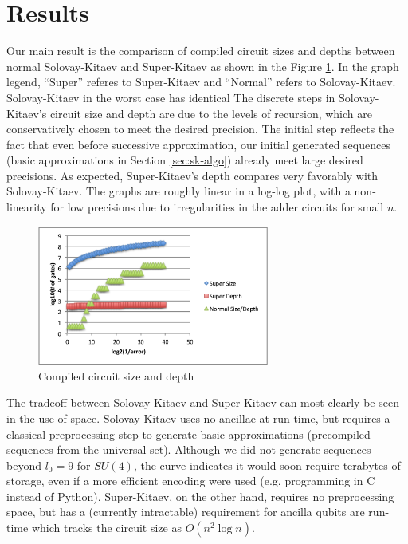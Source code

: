 \section{Results}
\label{sec:results}

Our main result is the comparison of compiled circuit sizes and depths between 
normal Solovay-Kitaev and Super-Kitaev as shown in the Figure
\ref{fig:size-depth}. In the graph legend, ``Super'' referes to Super-Kitaev
and ``Normal'' refers to Solovay-Kitaev.
Solovay-Kitaev in the worst case has identical
The discrete steps in Solovay-Kitaev's circuit size and depth are due
to the levels of recursion, which are conservatively chosen to meet
the desired precision. The initial step reflects the fact that even
before successive approximation, our initial generated sequences
(basic approximations in Section \ref{sec:sk-algo}) already meet large
desired precisions. As expected, Super-Kitaev's depth compares very
favorably with Solovay-Kitaev.
The graphs are roughly linear in a log-log plot, with a non-linearity
for low precisions due to irregularities in the adder circuits for small
$n$.

\begin{center}
\begin{figure}[h!]
\label{fig:size-depth}
\includegraphics[width=3in]{circuit-size-depth.eps}
\caption{Compiled circuit size and depth}
\end{figure}
\end{center}

The tradeoff between Solovay-Kitaev and Super-Kitaev can most clearly
be seen in the use of space. Solovay-Kitaev uses no ancillae at run-time,
but requires a classical preprocessing step to generate basic
approximations (precompiled sequences from the universal set). Although
we did not generate sequences beyond $l_0 = 9$ for $SU(4)$, the curve
indicates it would soon require terabytes of storage, even if a more
efficient encoding were used (e.g. programming in C instead of Python).
Super-Kitaev, on the other hand, requires no preprocessing space, but
has a (currently intractable) requirement for ancilla qubits are run-time
which tracks the circuit size as $O(n^2 \log n)$.

